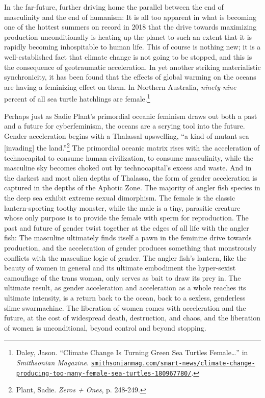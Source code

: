 \documentclass[10pt, statementpaper, twoside, openright]{memoir}
\begin{document}
In the far-future, further driving home the parallel between the end of masculinity and the end of humanism: It is all too apparent in what is becoming one of the hottest summers on record in 2018 that the drive towards maximizing production unconditionally is heating up the planet to such an extent that it is rapidly becoming inhospitable to human life. This of course is nothing new; it is a well-established fact that climate change is not going to be stopped, and this is the consequence of geotraumatic acceleration. In yet another striking materialistic synchronicity, it has been found that the effects of global warming on the oceans are having a feminizing effect on them. In Northern Australia, \emph{ninety-nine} percent of all sea turtle hatchlings are female.\footnote{Daley, Jason. ``Climate Change Is Turning Green Sea Turtles Female\dots'' in \textit{Smithsonian Magazine}. \href{https://www.smithsonianmag.com/smart-news/climate-change-producing-too-many-female-sea-turtles-180967780/}{\nolinkurl{smithsonianmag.com/smart-news/climate-change-producing-too-many-female-sea-turtles-180967780/}}.}

Perhaps just as Sadie Plant's primordial oceanic feminism draws out both a past and a future for cyberfeminism, the oceans are a scrying tool into the future. Gender acceleration begins with a Thalassal upswelling, ``a kind of mutant sea [invading] the land.''\footnote{Plant, Sadie. \textit{Zeros + Ones}, p. 248-249.} The primordial oceanic matrix rises with the acceleration of technocapital to consume human civilization, to consume masculinity, while the masculine sky becomes choked out by technocapital's excess and waste. And in the darkest and most alien depths of Thalassa, the form of gender acceleration is captured in the depths of the Aphotic Zone. The majority of angler fish species in the deep sea exhibit extreme sexual dimorphism. The female is the classic lantern-sporting toothy monster, while the male is a tiny, parasitic creature whose only purpose is to provide the female with sperm for reproduction. The past and future of gender twist together at the edges of all life with the angler fish: The masculine ultimately finds itself a pawn in the feminine drive towards production, and the acceleration of gender produces something that monstrously conflicts with the masculine logic of gender. The angler fish's lantern, like the beauty of women in general and its ultimate embodiment the hyper-sexist camouflage of the trans woman, only serves as bait to draw its prey in. The ultimate result, as gender acceleration and acceleration as a whole reaches its ultimate intensity, is a return back to the ocean, back to a sexless, genderless slime swarmachine. The liberation of women comes with acceleration and the future, at the cost of widespread death, destruction, and chaos, and the liberation of women is unconditional, beyond control and beyond stopping.
\end{document}

